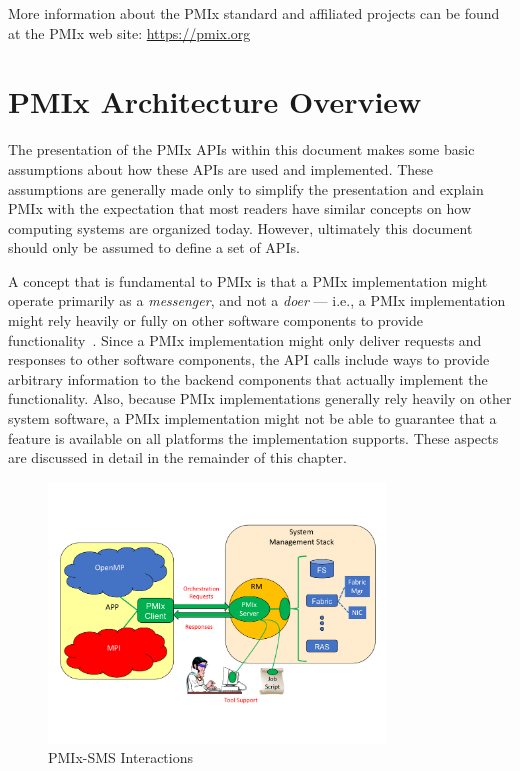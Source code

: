 More information about the \ac{PMIx} standard and affiliated projects can be found at the \ac{PMIx} web site: \url{https://pmix.org}


\section{PMIx Architecture Overview}
\label{chap:intro:arch_overview}

The presentation of the \ac{PMIx} \acp{API} within this document makes some
basic assumptions about how these \acp{API}
are used and implemented.  These assumptions are generally made only to simplify
the presentation and explain \ac{PMIx} with the expectation that most readers
have similar concepts on how computing systems are organized today.  However, ultimately
this document should only be assumed to define a set of \acp{API}.

A concept that is fundamental to \ac{PMIx} is that a \ac{PMIx} implementation might
operate primarily as a \textit{messenger}, and not a \textit{doer} --- i.e., a \ac{PMIx}
implementation might rely heavily or fully on other software components to provide
functionality~\cite{2017-Castain-EuroMPI}.
Since a \ac{PMIx} implementation might only deliver requests and responses to other
software components, the \ac{API} calls include ways to provide arbitrary information to the
backend components that actually
implement the functionality.  Also, because \ac{PMIx} implementations generally rely heavily
on other system software, a PMIx implementation might not be able to guarantee that a feature
is available on all platforms the implementation supports.  These aspects are discussed in
detail in the remainder of this chapter.

\begingroup
\begin{figure}[ht!]
  \begin{center}
    \includegraphics[clip,width=0.8\textwidth]{figs/PMIxRoles.pdf}
  \end{center}
  \caption{PMIx-SMS Interactions}
  \label{fig:roles}
\end{figure}
\endgroup


